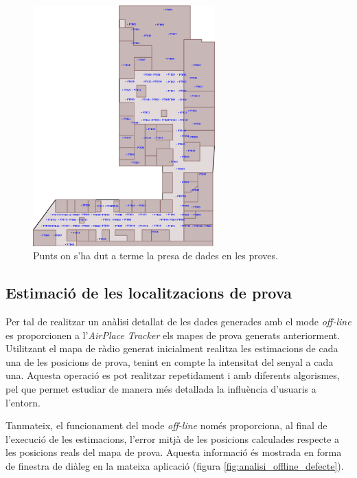 \begin{figure}[ht]
\begin{center}
\includegraphics[width=7cm]{imatges/planol_proves.png}
\caption{Punts on s'ha dut a terme la presa de dades en les proves.}
\label{fig:planol_proves}
\end{center}
\end{figure}

\subsection{Estimació de les localitzacions de prova}

Per tal de realitzar un anàlisi detallat de les dades generades amb el mode \textit{off-line} es proporcionen a l'\textit{AirPlace Tracker} els mapes de prova generats anteriorment. Utilitzant el mapa de ràdio generat inicialment realitza les estimacions de cada una de les posicions de prova, tenint en compte la intensitat del senyal a cada una. Aquesta operació es pot realitzar repetidament i amb diferents algorismes, pel que permet estudiar de manera més detallada la influència d'usuaris a l'entorn.

Tanmateix, el funcionament del mode \textit{off-line} només proporciona, al final de l'execució de les estimacions, l'error mitjà de les posicions calculades respecte a les posicions reals del mapa de prova. Aquesta informació és mostrada en forma de finestra de diàleg en la mateixa aplicació (figura \ref{fig:analisi_offline_defecte}).

